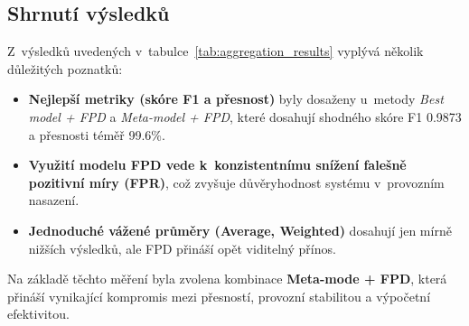 \subsection*{Shrnutí výsledků}

Z~výsledků uvedených v~tabulce~\ref{tab:aggregation_results} vyplývá několik důležitých poznatků:

\begin{itemize}
    \item \textbf{Nejlepší metriky (skóre F1 a přesnost)} byly dosaženy u~metody \textit{Best model + FPD} a \textit{Meta-model + FPD}, které dosahují shodného skóre F1 0.9873 a přesnosti téměř 99.6\%.
    \item \textbf{Využití modelu FPD vede k~konzistentnímu snížení falešně pozitivní míry (FPR)}, což zvyšuje důvěryhodnost systému v~provozním nasazení.
    \item \textbf{Jednoduché vážené průměry (Average, Weighted)} dosahují jen mírně nižších výsledků, ale FPD přináší opět viditelný přínos.
\end{itemize}

\noindent Na základě těchto měření byla zvolena kombinace \textbf{Meta-mode + FPD}, která přináší vynikající kompromis mezi přesností, provozní stabilitou a výpočetní efektivitou.




